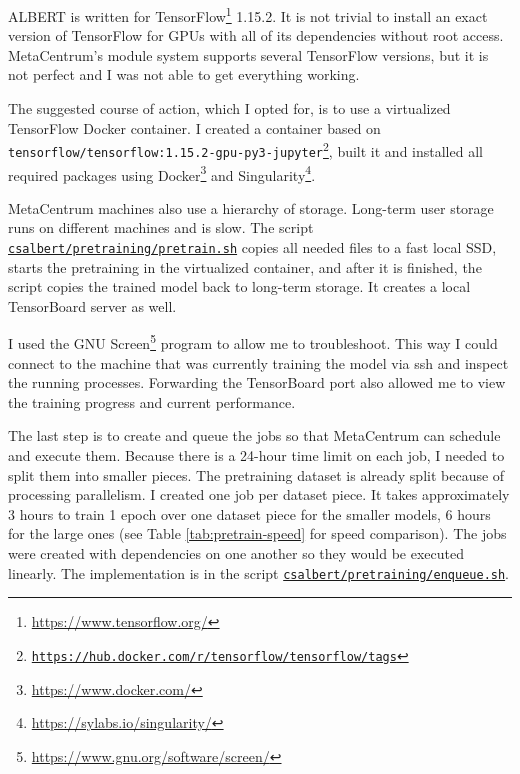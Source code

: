 \documentclass[
  printed, %
  color,   %
  table,   %
  oneside, %
  lof,     %
  lot,     %
]{fithesis3}
\begin{document}
\vspace{1em}
{\parindent=0cm
ALBERT is written for TensorFlow\footnote{\url{https://www.tensorflow.org/}} 1.15.2. It is not trivial to install an exact version of TensorFlow for GPUs with all of its dependencies without root access. MetaCentrum's module system supports several TensorFlow versions, but it is not perfect and I was not able to get everything working. 
}

The suggested course of action, which I opted for, is to use a virtualized TensorFlow Docker container. I created a container based on \texttt{tensorflow/tensorflow:1.15.2-gpu-py3-jupyter}\footnote{
\href{https://hub.docker.com/layers/tensorflow/tensorflow/1.15.2-gpu-py3-jupyter/images/sha256-2c2ddc9780724ee528757f44beb16dac302a09ee7eb4e333b7dd85404597fdd9}
    {\texttt{https://hub.docker.com/r/tensorflow/tensorflow/tags}}
}, built it and installed all required packages using Docker\footnote{\url{https://www.docker.com/}} and Singularity\footnote{\url{https://sylabs.io/singularity/}}.

MetaCentrum machines also use a hierarchy of storage. Long-term user storage runs on different machines and is slow. The script \href{https://github.com/ZepZep/csalbert/blob/master/pretraining/pretrain.sh}{\texttt{csalbert/pretraining/pretrain.sh}} copies all needed files to a fast local SSD, starts the pretraining in the virtualized container, and after it is finished, the script copies the trained model back to long-term storage. It creates a local TensorBoard server as well. 

I used the GNU Screen\footnote{\url{https://www.gnu.org/software/screen/}} program to allow me to troubleshoot. This way I could connect to the machine that was currently training the model via ssh and inspect the running processes. Forwarding the TensorBoard port also allowed me to view the training progress and current performance.

The last step is to create and queue the jobs so that MetaCentrum can schedule and execute them. Because there is a 24-hour time limit on each job, I needed to split them into smaller pieces. The pretraining dataset is already split because of processing parallelism. I created one job per dataset piece. It takes approximately 3 hours to train 1 epoch over one dataset piece for the smaller models, 6 hours for the large ones (see Table \ref{tab:pretrain-speed} for speed comparison). The jobs were created with dependencies on one another so they would be executed linearly. The implementation is in the script \href{https://github.com/ZepZep/csalbert/blob/master/pretraining/enqueue.sh}{\texttt{csalbert/pretraining/enqueue.sh}}.
\end{document}
